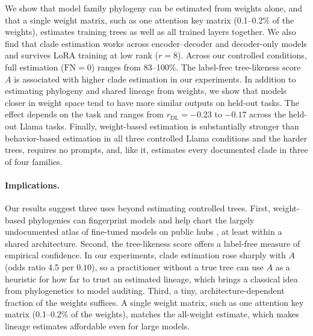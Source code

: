 \documentclass{article}
\theoremstyle{definition}
\theoremstyle{plain}
\newif\ifrevision
\newcommand{\rev}[1]{\ifrevision{\color{blue}#1}\else#1\fi}
\newcommand{\revtag}[1]{\ifrevision\textsuperscript{\color{blue}\sffamily\scriptsize[#1]}\fi}
\begin{document}
We show that model family phylogeny can be estimated from weights alone, and that a single weight matrix, such as one attention key matrix (0.1--0.2\% of the weights), estimates training trees as well as all trained layers together. We also find that clade estimation works across encoder--decoder and decoder-only models and survives LoRA training at low rank ($r=8$). Across our controlled conditions, full estimation ($\mathrm{FN}=0$) ranges from \rev{83}--100\%\revtag{Corr.}. The label-free tree-likeness score $A$ is associated with higher clade estimation in our experiments. In addition to estimating phylogeny and shared lineage from weights, we show that models closer in weight space tend to have more similar outputs on held-out tasks. The effect depends on the task and ranges from $r_{\mathrm{DL}}=-0.23$ to $-0.17$ across the held-out Llama tasks. Finally, weight-based estimation is substantially stronger than behavior-based estimation in all three controlled Llama conditions \rev{and the harder trees}, requires no prompts, and, like it, estimates every documented clade in \rev{three of four}\revtag{S8sV} families.


\paragraph{Implications.} Our results suggest three uses beyond estimating controlled trees. First, weight-based phylogenies can fingerprint models and help chart the largely undocumented atlas of fine-tuned models on public hubs \citep{horwitz2025chartatlasworldsmodels}, at least within a shared architecture. Second, the tree-likeness score offers a label-free measure of empirical confidence. In our experiments, clade estimation rose sharply with $A$ (odds ratio 4.5 per $0.10$), so a practitioner without a true tree can use $A$ as a heuristic for how far to trust an estimated lineage, which brings a classical idea from phylogenetics to model auditing. Third, a tiny, architecture-dependent fraction of the weights suffices. A single weight matrix, such as one attention key matrix (0.1--0.2\% of the weights), matches the all-weight estimate, which makes lineage estimates affordable even for large models.
\end{document}
